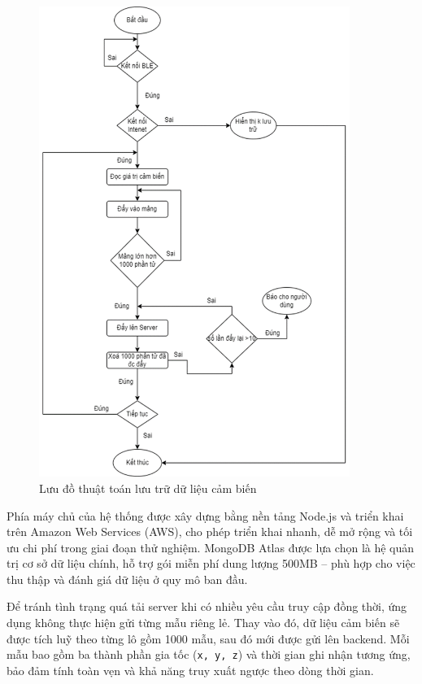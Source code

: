 \begin{figure}[htbp]
\centering
\includegraphics[width=0.9\textwidth]{images/flow_http.png}
\caption{Lưu đồ thuật toán lưu trữ dữ liệu cảm biến}
\label{flow_http}
\end{figure}
Phía máy chủ của hệ thống được xây dựng bằng nền tảng Node.js và triển khai 
trên Amazon Web Services (AWS), cho phép triển khai nhanh, dễ mở rộng và tối 
ưu chi phí trong giai đoạn thử nghiệm. MongoDB Atlas được lựa chọn là hệ quản 
trị cơ sở dữ liệu chính, hỗ trợ gói miễn phí dung lượng 500MB – phù hợp cho 
việc thu thập và đánh giá dữ liệu ở quy mô ban đầu.

Để tránh tình trạng quá tải server khi có nhiều yêu cầu truy cập đồng thời, 
ứng dụng không thực hiện gửi từng mẫu riêng lẻ. Thay vào đó, dữ liệu cảm biến 
sẽ được tích luỹ theo từng lô gồm 1000 mẫu, sau đó mới được gửi lên backend. 
Mỗi mẫu bao gồm ba thành phần gia tốc (\texttt{x, y, z}) và thời gian ghi 
nhận tương ứng, bảo đảm tính toàn vẹn và khả năng truy xuất ngược theo dòng 
thời gian.

